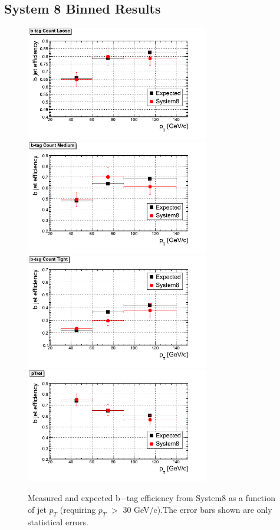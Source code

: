 \subsection{System 8 Binned Results}
\begin{figure}[htbp]
  \begin{center}
    \includegraphics[width=80mm]{Figures/TCL_Tag.png}
    \includegraphics[width=80mm]{Figures/TCM_Tag.png}
    \includegraphics[width=80mm]{Figures/TCT_Tag.png}
    \includegraphics[width=80mm]{Figures/pTrel.png}
  \end{center}
  \caption{Measured and expected b$-$tag efficiency from System8 as a function of jet $p_T $ (requiring $p_T $ $> $ 30 GeV/c).The error bars shown are only statistical errors.}
  \label{fig:S8_TC_results}
\end{figure}


